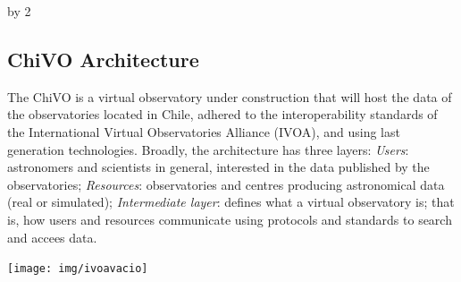 \documentclass[11pt]{scrartcl}
\def\anzspalten{2}
\newlength{\kastenwidth}
\newenvironment{kasten}{
  \begin{lrbox}{\dummybox}
    \begin{minipage}{\linewidth}}
    {\end{minipage}
  \end{lrbox}
  \raisebox{-\depth}{\psshadowbox[cornersize=absolute,linearc=14pt,framesep=1em]{\usebox{\dummybox}}}\\[0.5em]}
\newenvironment{spalte}{
  \setlength\kastenwidth{1.2\textwidth}
  \divide\kastenwidth by \anzspalten
  \begin{minipage}[t]{\kastenwidth}}{\end{minipage}}
\begin{document}
\begin{lrbox}{\spalten}
{\begin{spalte}
	\begin{kasten}
        \section*{\hspace{0.2cm} {\color{red} ChiVO Architecture} }

			\begin{minipage}{0.45\linewidth}
			The ChiVO is a virtual observatory under construction
			that will host the data of the observatories located in Chile, adhered to the
			interoperability standards of the International Virtual Observatories Alliance
			(IVOA), and using last generation technologies.  Broadly, the architecture has
			three layers: \emph{Users}:  astronomers and scientists in general, interested
			in the data published by the observatories; \emph{Resources}: observatories and
			centres producing astronomical data (real or simulated); \emph{Intermediate
			layer}: defines what a virtual observatory is; that is, how users and resources
			communicate using protocols and standards to search and accees data.
			\end{minipage}

			\begin{minipage}{0.45\linewidth}
                        \texttt{[image: img/ivoavacio]}
                        \end{minipage}





\end{kasten}
\end{spalte}}
\end{lrbox}
\end{document}
